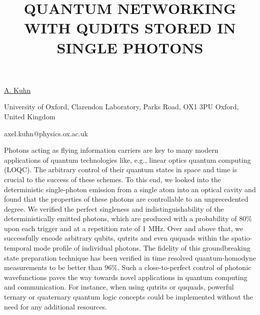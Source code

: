\title{QUANTUM NETWORKING WITH QUDITS STORED IN SINGLE PHOTONS}

\underline{A. Kuhn}

{\normalsize{\vspace{-4mm}
University of Oxford, Clarendon Laboratory, Parks Road, OX1 3PU Oxford, United Kingdom

\email axel.kuhn@physics.ox.ac.uk}}

Photons acting as flying information carriers are key to many modern applications of quantum technologies like, e.g., linear optics
quantum computing (LOQC). The arbitrary control of their quantum states in space and time is crucial to the success of these
schemes. To this end, we looked into the deterministic single-photon emission from a single atom into an optical cavity and
found that the properties of these photons are controllable to an unprecedented degree. We verified the perfect singleness and
indistinguishability of the deterministically emitted photons, which are produced with a probability of 80$\%$ upon each trigger and
at a repetition rate of 1 MHz. Over and above that, we successfully encode arbitrary qubits, qutrits and even ququads within the
spatio-temporal mode profile of individual photons. The fidelity of this groundbreaking state preparation technique has been
verified in time resolved quantum-homodyne measurements to be better than 96$\%$. Such a close-to-perfect control of photonic
wavefunctions paves the way towards novel applications in quantum computing and communication. For instance, when using
qutrits or ququads, powerful ternary or quaternary quantum logic concepts could be implemented without the need for any
additional resources.

\vspace{\baselineskip}

